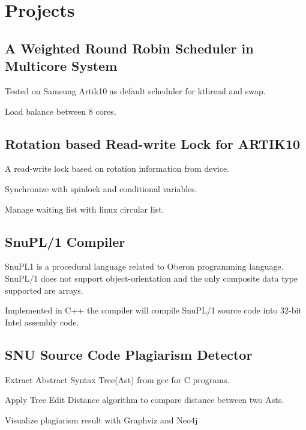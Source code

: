 \documentclass[letterpaper]{article}
\renewenvironment{itemize}{
  \begin{list}{}{
    \setlength{\leftmargin}{1.5em}
  }
}{
  \end{list}
}
\begin{document}
\section*{Projects}

\subsection*{A Weighted Round Robin Scheduler in Multicore System}
\begin{itemize}
	\item Tested on Samsung Artik10 as default scheduler for kthread and swap.
	\item Load balance between 8 cores.
\end{itemize}

\subsection*{Rotation based Read-write Lock for ARTIK10}
\begin{itemize}
\item A read-write lock based on rotation information from device.	
\item Synchronize with spinlock and conditional variables.	
\item Manage waiting list with linux circular list.	\\
\end{itemize}

\subsection*{SnuPL/1 Compiler}
\begin{itemize}
\item SnuPL1 is a procedural language related to Oberon programming language. SnuPL/1 does not support object-orientation and the only composite data type supported are arrays.	
\item Implemented in C++ the compiler will compile SnuPL/1 source code into 32-bit Intel assembly code.	\\
\end{itemize}

\subsection*{SNU Source Code Plagiarism Detector}
\begin{itemize}
\item Extract Abstract Syntax Tree(Ast) from gcc for C programs.	
\item Apply Tree Edit Distance algorithm to compare distance between two Asts.	
\item Visualize plagiarism result with Graphviz and Neo4j	\\
\end{itemize}
\end{document}

